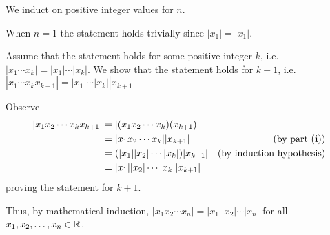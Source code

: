 \begin{questions}
\begin{partquestions}{\roman*}
        \item We induct on positive integer values for $n$.

        When $n = 1$ the statement holds trivially since $|x_1| = |x_1|$.

        Assume that the statement holds for some positive integer $k$, i.e. $|x_1\cdots x_k| = |x_1|\cdots|x_k|$. We show that the statement holds for $k+1$, i.e. $|x_1\cdots x_kx_{k+1}| = |x_1|\cdots|x_k||x_{k+1}|$

        Observe
        \begin{align*}
            |x_1x_2\cdots x_kx_{k+1}| &= |(x_1x_2\cdots x_k)(x_{k+1})|\\
            &= |x_1x_2\cdots x_k||x_{k+1}| & (\text{by part (\textbf{i})})\\
            &= (|x_1||x_2|\cdots|x_k|)|x_{k+1}| & (\text{by induction hypothesis})\\
            &= |x_1||x_2|\cdots|x_k||x_{k+1}|
        \end{align*}
        proving the statement for $k + 1$.

        Thus, by mathematical induction, $|x_1x_2\cdots x_n| = |x_1||x_2|\cdots|x_n|$ for all $x_1, x_2, \dots, x_n \in \mathbb{R}$.
    \end{partquestions}
\end{questions}

